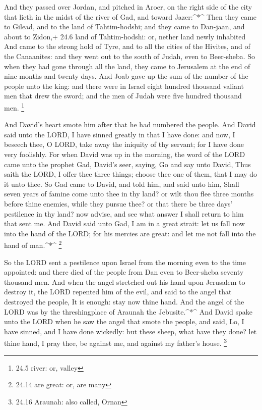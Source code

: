  And they passed over Jordan, and pitched in Aroer, on the
right side of the city that lieth in the midst of the river of Gad, and
toward Jazer:\^{}*\^{}  Then they came to Gilead, and to the
land of Tahtim-hodshi; and they came to Dan-jaan, and about to Zidon,+
24.6 land of Tahtim-hodshi: or, nether land newly inhabited 
And came to the strong hold of Tyre, and to all the cities of the
Hivites, and of the Canaanites: and they went out to the south of Judah,
even to Beer-sheba.  So when they had gone through all the
land, they came to Jerusalem at the end of nine months and twenty days.
 And Joab gave up the sum of the number of the people unto
the king: and there were in Israel eight hundred thousand valiant men
that drew the sword; and the men of Judah were five hundred thousand
men. \footnote{24.5 river: or, valley}

 And David's heart smote him after that he had numbered the
people. And David said unto the LORD, I have sinned greatly in that I
have done: and now, I beseech thee, O LORD, take away the iniquity of
thy servant; for I have done very foolishly.  For when
David was up in the morning, the word of the LORD came unto the prophet
Gad, David's seer, saying,  Go and say unto David, Thus
saith the LORD, I offer thee three things; choose thee one of them, that
I may do it unto thee.  So Gad came to David, and told him,
and said unto him, Shall seven years of famine come unto thee in thy
land? or wilt thou flee three months before thine enemies, while they
pursue thee? or that there be three days' pestilence in thy land? now
advise, and see what answer I shall return to him that sent me.
 And David said unto Gad, I am in a great strait: let us
fall now into the hand of the LORD; for his mercies are great: and let
me not fall into the hand of man.\^{}*\^{} \footnote{24.14 are great:
  or, are many}

 So the LORD sent a pestilence upon Israel from the morning
even to the time appointed: and there died of the people from Dan even
to Beer-sheba seventy thousand men.  And when the angel
stretched out his hand upon Jerusalem to destroy it, the LORD repented
him of the evil, and said to the angel that destroyed the people, It is
enough: stay now thine hand. And the angel of the LORD was by the
threshingplace of Araunah the Jebusite.\^{}*\^{}  And David
spake unto the LORD when he saw the angel that smote the people, and
said, Lo, I have sinned, and I have done wickedly: but these sheep, what
have they done? let thine hand, I pray thee, be against me, and against
my father's house. \footnote{24.16 Araunah: also called, Ornan}

